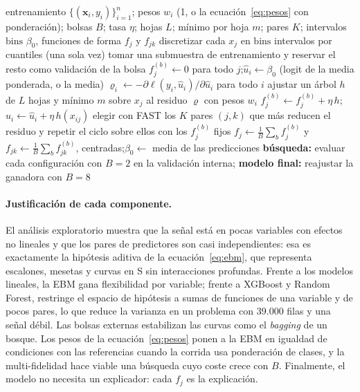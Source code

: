 \begin{algorithm}[t]
  \caption{Entrenamiento de la EBM con bolsas externas, pesos de clase y multi-fidelidad.}
  \label{alg:ebm}
  \begin{algorithmic}[1]
    \Require entrenamiento $\{(\bm{x}_i, y_i)\}_{i=1}^{n}$; pesos $w_i$ (1, o la ecuación~\eqref{eq:pesos} con ponderación); bolsas $B$; tasa $\eta$; hojas $L$; mínimo por hoja $m$; pares $K$; intervalos $\mathrm{bins}$
    \Ensure $\beta_0$, funciones de forma $f_j$ y $f_{jk}$
    \State discretizar cada $x_j$ en $\mathrm{bins}$ intervalos por cuantiles (una sola vez)
      \State tomar una submuestra de entrenamiento y reservar el resto como validación de la bolsa
      \State $f_j^{(b)} \gets 0$ para todo $j$;\quad $\hat{u}_i \gets \beta_0$ (logit de la media ponderada, o la media)
         
          \State $\varrho_i \gets -\partial \ell(y_i, \hat{u}_i) / \partial \hat{u}_i$ para todo $i$
          \State ajustar un árbol $h$ de $L$ hojas y mínimo $m$ sobre $x_j$ al residuo $\varrho$ con pesos $w_i$
          \State $f_j^{(b)} \gets f_j^{(b)} + \eta\, h$;\quad $\hat{u}_i \gets \hat{u}_i + \eta\, h(x_{ij})$
        \EndFor
      \EndWhile
      \State elegir con FAST los $K$ pares $(j, k)$ que más reducen el residuo y repetir el ciclo sobre ellos con los $f_j^{(b)}$ fijos
    \EndFor
    \State $f_j \gets \frac{1}{B}\sum_b f_j^{(b)}$ y $f_{jk} \gets \frac{1}{B}\sum_b f_{jk}^{(b)}$, centradas;\quad $\beta_0 \gets$ media de las predicciones
    \State \textbf{búsqueda:} evaluar cada configuración con $B = 2$ en la validación interna; \textbf{modelo final:} reajustar la ganadora con $B = 8$
  \end{algorithmic}
\end{algorithm}

\paragraph{Justificación de cada componente.}
El análisis exploratorio muestra que la señal está en pocas variables con efectos no lineales y que los
pares de predictores son casi independientes: esa es exactamente la hipótesis aditiva de la
ecuación~\eqref{eq:ebm}, que representa escalones, mesetas y curvas en S sin interacciones profundas. Frente
a los modelos lineales, la EBM gana flexibilidad por variable; frente a XGBoost y Random Forest, restringe el
espacio de hipótesis a sumas de funciones de una variable y de pocos pares, lo que reduce la varianza en un
problema con 39.000 filas y una señal débil. Las bolsas externas estabilizan las curvas como el
\emph{bagging} de un bosque. Los pesos de la ecuación~\eqref{eq:pesos} ponen a la EBM en igualdad de
condiciones con las referencias cuando la corrida usa ponderación de clases, y la multi-fidelidad hace viable
una búsqueda cuyo coste crece con $B$. Finalmente, el modelo no necesita un explicador: cada $f_j$ es la
explicación.

